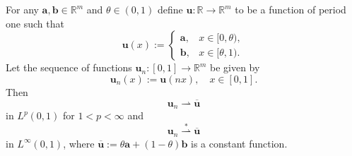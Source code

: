 \begin{Lemma}
\label{lem:oscillating-sequence-average}
For any $\bm{a},\bm{b}\in\mathbb{R}^m$ and $\theta\in(0,1)$ define $\bm{u}:\mathbb{R}\to\mathbb{R}^m$ to be a function of period one such that
\begin{equation}\label{eq:oscillating-two-value-periodic-function}
\bm{u}(x):=\begin{cases}\bm{a},&x\in[0,\theta),\\\bm{b},&x\in[\theta,1).\end{cases}
\end{equation}
Let the sequence of functions $\bm{u}_n:[0,1]\to\mathbb{R}^m$ be given by
\begin{equation}\label{eq:oscillating-rescaled-periodic-sequence}
\bm{u}_n(x):=\bm{u}(nx),\quad x\in[0,1].
\end{equation}
Then
\begin{equation}\label{eq:oscillating-sequence-weak-lp-limit}
\bm{u}_n\rightharpoonup\overline{\bm{u}}
\end{equation}
in $L^p(0,1)$ for $1<p<\infty$ and
\begin{equation}\label{eq:oscillating-sequence-weak-star-linfty-limit}
\bm{u}_n\overset{*}{\rightharpoonup}\overline{\bm{u}}
\end{equation}
in $L^\infty(0,1)$, where $\overline{\bm{u}}:=\theta\bm{a}+(1-\theta)\bm{b}$ is a constant function.
\end{Lemma}

